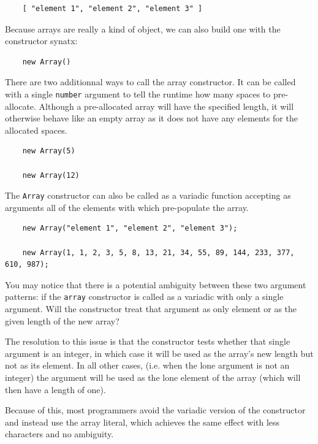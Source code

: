 \documentclass[11pt,letter]{book}
\begin{document}
    \begin{verbatim}
    [ "element 1", "element 2", "element 3" ]
    \end{verbatim}
    
    Because arrays are really a kind of object, we can also build one with the constructor synatx:
    
    \begin{verbatim}
    new Array()
    \end{verbatim}
    
    There are two additionnal ways to call the array constructor. It can be called with a single 
    \texttt{number} argument to tell the runtime how many spaces to pre-allocate. Although a 
    pre-allocated array will have the specified length, it will otherwise behave like an empty array
    as it does not have any elements for the allocated spaces.
    
    \begin{verbatim}
    new Array(5)
    
    new Array(12)
    \end{verbatim}
    
    The \texttt{Array} constructor can also be called as a variadic function accepting as arguments
    all of the elements with which pre-populate the array.
    
    \begin{verbatim}
    new Array("element 1", "element 2", "element 3");
    
    new Array(1, 1, 2, 3, 5, 8, 13, 21, 34, 55, 89, 144, 233, 377, 610, 987);
    \end{verbatim}
    
    You may notice that there is a potential ambiguity between these two argument patterns: if the
    \texttt{array} constructor is called as a variadic with only a single argument. Will the
    constructor treat that argument as only element or as the given length of the new array? 
    
    The resolution to this issue is that the constructor tests whether that single argument is an 
    integer, in which case it will be used as the array's new length but not as its element. In all 
    other cases, (i.e. when the lone argument is not an integer) the argument will be used as the 
    lone element of the array (which will then have a length of one). 
    
    Because of this, most programmers avoid the variadic version of the constructor and instead use 
    the array literal, which achieves the same effect with less characters and no ambiguity.
    
\end{document}
